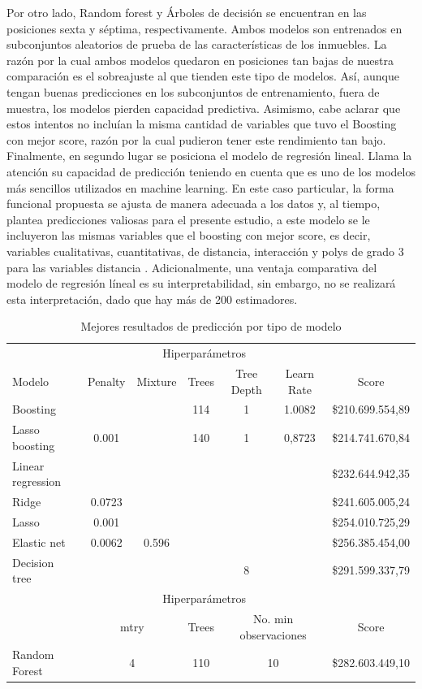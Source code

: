 \documentclass[12pt]{article}
\begin{document}
Por otro lado, Random forest y Árboles de decisión se encuentran en las posiciones sexta y séptima, respectivamente. Ambos modelos son entrenados en subconjuntos aleatorios de prueba de las características de los inmuebles. La razón por la cual ambos modelos quedaron en posiciones tan bajas de nuestra comparación es el sobreajuste al que tienden este tipo de modelos. Así, aunque tengan buenas predicciones en los subconjuntos de entrenamiento, fuera de muestra, los modelos pierden capacidad predictiva. Asimismo, cabe aclarar que estos intentos no incluían la misma cantidad de variables que tuvo el Boosting con mejor score, razón por la cual pudieron tener este rendimiento tan bajo.\\

Finalmente, en segundo lugar se posiciona el modelo de regresión lineal. Llama la atención su capacidad de predicción teniendo en cuenta que es uno de los modelos más sencillos utilizados en machine learning. En este caso particular, la forma funcional propuesta se ajusta de manera adecuada a los datos y, al tiempo, plantea predicciones valiosas para el presente estudio, a este modelo se le incluyeron las mismas variables que el boosting con mejor score, es decir, variables cualitativas, cuantitativas, de distancia, interacción y polys de grado 3 para las variables distancia . Adicionalmente, una ventaja comparativa del modelo de regresión líneal es su interpretabilidad, sin embargo, no se realizará esta interpretación, dado que hay más de 200 estimadores.\\

    \begin{table}[ht]
    \centering
        \begin{tabular}{lcccccc}
        \hline
        & \multicolumn{5}{c}{Hiperparámetros} &\\
        \cline{2-6}
        Modelo & Penalty & Mixture & Trees & Tree Depth & Learn Rate & Score \\
        \hline
        Boosting & & &114 & 1& 1.0082 & \$210.699.554,89 \\        
        Lasso boosting & 0.001 & & 140 & 1 & 0,8723 & \$214.741.670,84\\
        Linear regression & & & & & & \$232.644.942,35 \\
        Ridge & 0.0723 & & & & &\$241.605.005,24 \\
        Lasso & 0.001 & & & & & \$254.010.725,29 \\
        Elastic net & 0.0062 &0.596& & & & \$256.385.454,00 \\
        Decision tree &  & & & 8 & & \$291.599.337,79 \\
        \hline
        & \multicolumn{5}{c}{Hiperparámetros} &\\
        \cline{2-6}
        & \multicolumn{2}{c}{mtry} & Trees & \multicolumn{2}{c}{No. min observaciones} & Score \\
        Random Forest & \multicolumn{2}{c}{4} & 110 & \multicolumn{2}{c}{10} & \$282.603.449,10 \\
        \hline
        \end{tabular}
        \caption{Mejores resultados de predicción por tipo de modelo}
    \end{table}
\end{document}
